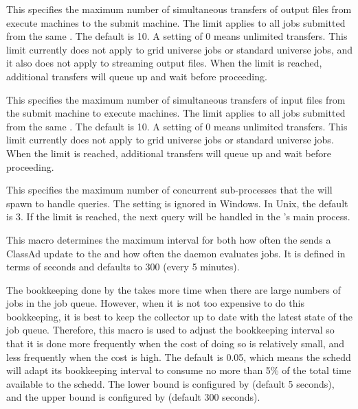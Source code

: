 \begin{description}
\label{param:MaxConcurrentDownloads}
\item[\Macro{MAX\_CONCURRENT\_DOWNLOADS}]
  This specifies the maximum
  number of simultaneous transfers of output files from execute
  machines to the submit machine.  The limit applies to all jobs
  submitted from the same .  The default is 10.  A
  setting of 0 means unlimited transfers.  This limit currently does
  not apply to grid universe jobs or standard universe jobs, and it
  also does not apply to streaming output files.  When the limit is
  reached, additional transfers will queue up and wait before
  proceeding.

\label{param:MaxConcurrentUploads}
\item[\Macro{MAX\_CONCURRENT\_UPLOADS}]
  This specifies the maximum
  number of simultaneous transfers of input files from the submit
  machine to execute machines.  The limit applies to all jobs
  submitted from the same .  The default is 10.  A
  setting of 0 means unlimited transfers.  This limit currently does
  not apply to grid universe jobs or standard universe jobs.  When the
  limit is reached, additional transfers will queue up and wait before
  proceeding.

\label{param:ScheddQueryWorkers}
\item[\Macro{SCHEDD\_QUERY\_WORKERS}]
  This specifies the maximum number of concurrent sub-processes that
  the  will spawn to handle queries.  The setting is
  ignored in Windows.  In Unix, the default is 3.  If the limit is
  reached, the next query will be handled in the 's main
  process.

\label{param:ScheddInterval}
\item[\Macro{SCHEDD\_INTERVAL}]
  This macro determines the maximum interval for both how often the
   sends a ClassAd update to the  and
  how often the  daemon evaluates jobs.  It is defined
  in terms of seconds and defaults to 300 (every 5 minutes).

\label{param:ScheddIntervalTimeslice}
\item[\Macro{SCHEDD\_INTERVAL\_TIMESLICE}]
  The bookkeeping done by the
   takes more time when there are large numbers of jobs
  in the job queue.  However, when it is not too expensive to do this
  bookkeeping, it is best to keep the collector up to date with the
  latest state of the job queue.  Therefore, this macro is used to
  adjust the bookkeeping interval so that it is done more frequently
  when the cost of doing so is relatively small, and less frequently
  when the cost is high.  The default is 0.05, which means the schedd
  will adapt its bookkeeping interval to consume no more than 5\% of the
  total time available to the schedd.  The lower bound is configured by
   (default 5 seconds), and the upper bound
  is configured by  (default 300 seconds).



\end{description}
